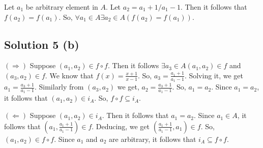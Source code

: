 \documentclass{article}
\begin{document}
Let $a_1$ be arbitrary element in $A$. Let $a_2 = a_1 + 1 / a_1 - 1$.
Then it follows that $f(a_2) = f(a_1)$. So, $\forall a_1 \in A \exists
a_2 \in A(f(a_2) = f(a_1))$.

\subsection{Solution 5 (b)}
$(\Rightarrow)$ Suppose $(a_1, a_2) \in f \circ f$. Then it follows
$\exists a_3 \in A (a_1, a_2) \in f$ and $(a_3,a_2) \in f$. We know
that $f(x) = \frac{x + 1}{x - 1}$. So, $a_3 = \frac{a_1 + 1}{a_1 -
  1}$. Solving it, we get $a_1 = \frac{a_3 + 1}{a_1 - 1}$. Similarly
from $(a_3, a_2)$ we get, $a_2 = \frac{a_3 + 1}{a_1 - 1}$. So, $a_1 =
a_2$. Since $a_1 = a_2$, it follows that $(a_1, a_2) \in i_A$. So, $f
\circ f \subseteq i_A$.

$(\Leftarrow)$ Suppose $(a_1, a_2) \in i_A$. Then it follows that $a_1
= a_2$. Since $a_1 \in A$, it follows that $(a_1, \frac{a_1 + 1}{a_1 -
  1}) \in f$. Deducing, we get $(\frac{a_1 + 1}{a_1 - 1}, a_1) \in f$.
So, $(a_1, a_2) \in f \circ f$. Since $a_1$ and $a_2$ are arbitrary,
it follows that $i_A \subseteq f \circ f$.
\end{document}
